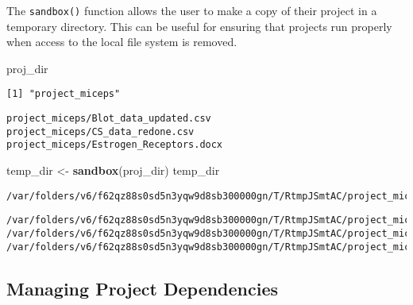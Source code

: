 \documentclass[12pt,twoside]{reedthesis}
\newenvironment{Shaded}{\begin{snugshade}}{\end{snugshade}}
\newcommand{\KeywordTok}[1]{\textcolor[rgb]{0.13,0.29,0.53}{\textbf{#1}}}
\newcommand{\DecValTok}[1]{\textcolor[rgb]{0.00,0.00,0.81}{#1}}
\newcommand{\StringTok}[1]{\textcolor[rgb]{0.31,0.60,0.02}{#1}}
\newcommand{\OperatorTok}[1]{\textcolor[rgb]{0.81,0.36,0.00}{\textbf{#1}}}
\newcommand{\NormalTok}[1]{#1}
\begin{document}
The \texttt{sandbox()} function allows the user to make a copy of their
project in a temporary directory. This can be useful for ensuring that
projects run properly when access to the local file system is removed.
\begin{Shaded}
\begin{Highlighting}[]
\NormalTok{proj_dir}
\end{Highlighting}
\end{Shaded}
\begin{verbatim}
[1] "project_miceps"
\end{verbatim}
\begin{Shaded}
\end{Shaded}
\begin{verbatim}
project_miceps/Blot_data_updated.csv
project_miceps/CS_data_redone.csv
project_miceps/Estrogen_Receptors.docx
\end{verbatim}
\begin{Shaded}
\begin{Highlighting}[]
\NormalTok{temp_dir <-}\StringTok{ }\KeywordTok{sandbox}\NormalTok{(proj_dir)}
\NormalTok{temp_dir}
\end{Highlighting}
\end{Shaded}
\begin{verbatim}
/var/folders/v6/f62qz88s0sd5n3yqw9d8sb300000gn/T/RtmpJSmtAC/project_miceps
\end{verbatim}
\begin{Shaded}
\end{Shaded}
\begin{verbatim}
/var/folders/v6/f62qz88s0sd5n3yqw9d8sb300000gn/T/RtmpJSmtAC/project_miceps/Blot_data_updated.csv
/var/folders/v6/f62qz88s0sd5n3yqw9d8sb300000gn/T/RtmpJSmtAC/project_miceps/CS_data_redone.csv
/var/folders/v6/f62qz88s0sd5n3yqw9d8sb300000gn/T/RtmpJSmtAC/project_miceps/Estrogen_Receptors.docx
\end{verbatim}
\subsection{Managing Project
Dependencies}\label{managing-project-dependencies}
\end{document}

